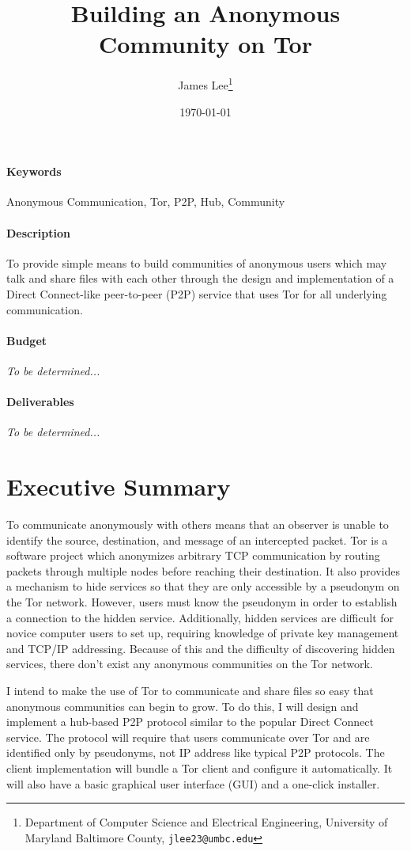 \documentclass[12pt]{article}
\title{Building an Anonymous Community on Tor}
\author{James Lee\thanks{
	Department of Computer Science and Electrical Engineering,
	University of Maryland Baltimore County,
	{\tt jlee23@umbc.edu}}}
\date{\today}
\begin{document}
\maketitle

\paragraph{Keywords} Anonymous Communication, Tor, P2P, Hub, Community

\paragraph{Description} To provide simple means to build communities of anonymous users which may talk and share files with each other through the design and implementation of a Direct Connect-like peer-to-peer (P2P) service that uses Tor for all underlying communication.

\paragraph{Budget} \emph{To be determined...}

\paragraph{Deliverables} \emph{To be determined...}

\section{Executive Summary}
To communicate anonymously with others means that an observer is unable to identify the source, destination, and message of an intercepted packet.  Tor is a software project which anonymizes arbitrary TCP communication by routing packets through multiple nodes before reaching their destination.  It also provides a mechanism to hide services so that they are only accessible by a pseudonym on the Tor network.  However, users must know the pseudonym in order to establish a connection to the hidden service.  Additionally, hidden services are difficult for novice computer users to set up, requiring knowledge of private key management and TCP/IP addressing.  Because of this and the difficulty of discovering hidden services, there don't exist any anonymous communities on the Tor network.

I intend to make the use of Tor to communicate and share files so easy that anonymous communities can begin to grow.  To do this, I will design and implement a hub-based P2P protocol similar to the popular Direct Connect service.  The protocol will require that users communicate over Tor and are identified only by pseudonyms, not IP address like typical P2P protocols.  The client implementation will bundle a Tor client and configure it automatically.  It will also have a basic graphical user interface (GUI) and a one-click installer.
\end{document}
